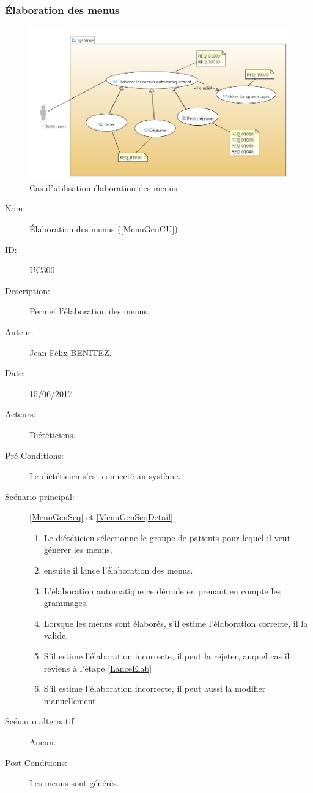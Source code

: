 \subsubsection{Élaboration des menus}
\begin{figure}
  \centering
      \includegraphics[width=1.00\textwidth]{../../CasDUtilisations/MenuGen/CasDUtilisation/MenuGen.png} %
\caption{Cas d'utilisation élaboration des menus}
\label{MenuGenCU}
\end{figure}

\begin{description}
\item[Nom:] Élaboration des menus (\autoref{MenuGenCU}).
\item[ID:] UC300
\item[Description:] Permet l'élaboration des menus.
\item[Auteur:] Jean-Félix BENITEZ.
\item[Date:] 15/06/2017
\item[Acteurs:] Diététiciens.
\item[Pré-Conditions:] Le diététicien s'est connecté au système.
\item[Scénario principal:] \autoref{MenuGenSeq} et \autoref{MenuGenSeqDetail}
  \begin{enumerate}
  \item Le diététicien sélectionne le groupe de patients pour lequel il veut générer les menus,
  \item \label{LanceElab}ensuite il lance l'élaboration des menus.
  \item L'élaboration automatique ce déroule en prenant en compte les grammages.
  \item Lorsque les menus sont élaborés, s'il estime l'élaboration correcte, il la valide.
  \item S'il estime l'élaboration incorrecte, il peut la rejeter, auquel cas il reviens à l'étape \ref{LanceElab}
  \item S'il estime l'élaboration incorrecte, il peut aussi la modifier manuellement.
  \end{enumerate}
\item[Scénario alternatif:] Aucun.
\item[Post-Conditions:] Les menus sont générés.
\end{description}

